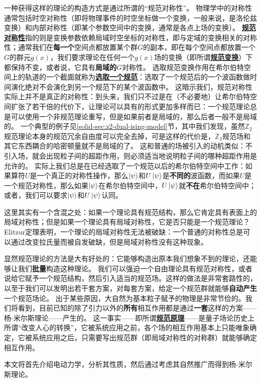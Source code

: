 \documentclass[hyperref, UTF8, a4paper]{ctexbook}
\newcommand{\concept}[1]{\underline{\textbf{#1}}}
\renewcommand{\emph}{\textbf}
\newcommand{\soliddoc}{\href{../solid/solid}{固体物理笔记}}
\begin{document}
一种获得这样的理论的构造方式是通过所谓的“规范对称性”。
物理学中的对称性通常包括时空对称性（即将物理事件的时空坐标做一个变换，一般来说，是洛伦兹变换）和内部对称性（即某个参数空间中的变换，通常是各点上场的变换）。
\concept{规范对称性}指的则是变换参数依赖局域时空坐标的对称性，即与定域的变换相关的对称性；通常我们在\emph{每一个}空间点都放置某个群$G$的副本，即在每个空间点都放置一个$G$的群元$g(x)$，我们要求理论在任何一个$g(x)$场的变换（即所谓\concept{规范变换}）下都保持不变，或者说，它具有\emph{局域的}$G$对称性。
选取规范变换作用在希尔伯特空间上的轨道的一个截面就称为\concept{选取一个规范}：选取了一个规范后的一个波函数做时间演化绝对不会演化到另一个规范下的某个波函数中。
这暗示我们，规范对称性实际上并不是真正的对称性：到头来，我们只不过是在（不必要地）让希尔伯特空间扩张了若干倍的代价下，让理论可以具有的形式更加多样而已：一个规范理论总是可以使用一个非规范理论重写，但是如果前者是局域的，那么后者一般不是局域的。
一个典型的例子见\ref{solid-sec:z2-dual-ising-model}节，其中我们发现，虽然$\mathbb{Z}_2$规范理论本身的规范冗余自由度可以完全去掉，可是这样的代价是，$\mathbb{Z}_2$规范场和其它东西耦合的哈密顿量就不是局域的了。
这和普通的场被引入的动机类似：不引入场，就会出现粒子间的超距作用，则必须适当地说明粒子间的哪种超距作用是允许的。
实际上我们总是在已经选取了一个规范以后的希尔伯特空间中工作：如果算符$U$是一个真正的对称性操作，那么$\ket{\psi}$和$U \ket{\psi}$是\emph{不同的}波函数，而如果$U$是一个规范对称性，那么如果$\ket{\psi}$在希尔伯特空间中，$U \ket{\psi}$就\emph{不在}希尔伯特空间中；或者，我们可以要求$\ket{\psi}$和$U \ket{\psi}$认同。

这里其实有一个含混之处：如果一个理论具有规范结构，那么它肯定具有表面上的局域对称性；但是如果一个理论具有局域对称性，它是否只能是一个规范理论？
Elitzur定理\cite{Elitzur_1975}表明，一个理论的局域对称性无法被破缺：一个普通的对称性总是可以通过改变拉氏量而被自发破缺，但是局域对称性没有这种现象。

显然规范理论的方法是大有好处的：它能够构造出原本我们想象不到的理论，还能够让我们\emph{批量}构造这种理论。
我们可以强迫一个自由理论具有规范对称性，或者说给它赋予一个规范结构，然后引入适当的规范场。这样的做法是非常套路性的，以至于我们可以发明出若干套方案，对每套方案，给定一个规范群就能够\emph{自动产生}一个规范场论。
出于某些原因，大自然为基本粒子赋予的物理是非常节俭的。我们将看到，目前已知的除了引力以外的\emph{所有}相互作用都是通过\emph{一套}这样的方案——杨-米尔斯理论——产生的。
这一事实——即所谓\concept{规范原理}——是量子场论历史上所谓“改变人心的转换”，它被系统应用之前，各个场的相互作用基本上只能唯象确定，它被系统应用之后，只需要写出规范群（即局域对称性的对称群）就能够确定相互作用。

本文将首先介绍电动力学，分析其性质，然后通过考虑其自然推广而得到杨-米尔斯理论。










 
\end{document}
